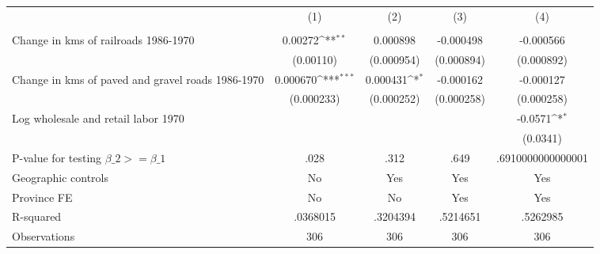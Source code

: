 {
\def\sym#1{\ifmmode^{#1}\else\(^{#1}\)\fi}
\begin{tabular}{l*{4}{c}}
\hline\hline
                &\multicolumn{1}{c}{(1)}&\multicolumn{1}{c}{(2)}&\multicolumn{1}{c}{(3)}&\multicolumn{1}{c}{(4)}\\
                &\multicolumn{1}{c}{}&\multicolumn{1}{c}{}&\multicolumn{1}{c}{}&\multicolumn{1}{c}{}\\
\hline
Change in kms of railroads 1986-1970&  0.00272\sym{**} & 0.000898         &-0.000498         &-0.000566         \\
                &(0.00110)         &(0.000954)         &(0.000894)         &(0.000892)         \\
[1em]
Change in kms of paved and gravel roads 1986-1970& 0.000670\sym{***}& 0.000431\sym{*}  &-0.000162         &-0.000127         \\
                &(0.000233)         &(0.000252)         &(0.000258)         &(0.000258)         \\
[1em]
Log wholesale and retail labor 1970&                  &                  &                  &  -0.0571\sym{*}  \\
                &                  &                  &                  & (0.0341)         \\
\hline
P-value for testing $\beta\_{2} >= \beta\_{1}$&     .028         &     .312         &     .649         &.6910000000000001         \\
Geographic controls&       No         &      Yes         &      Yes         &      Yes         \\
Province FE     &       No         &       No         &      Yes         &      Yes         \\
R-squared       & .0368015         & .3204394         & .5214651         & .5262985         \\
Observations    &      306         &      306         &      306         &      306         \\
\hline\hline
\end{tabular}
}
